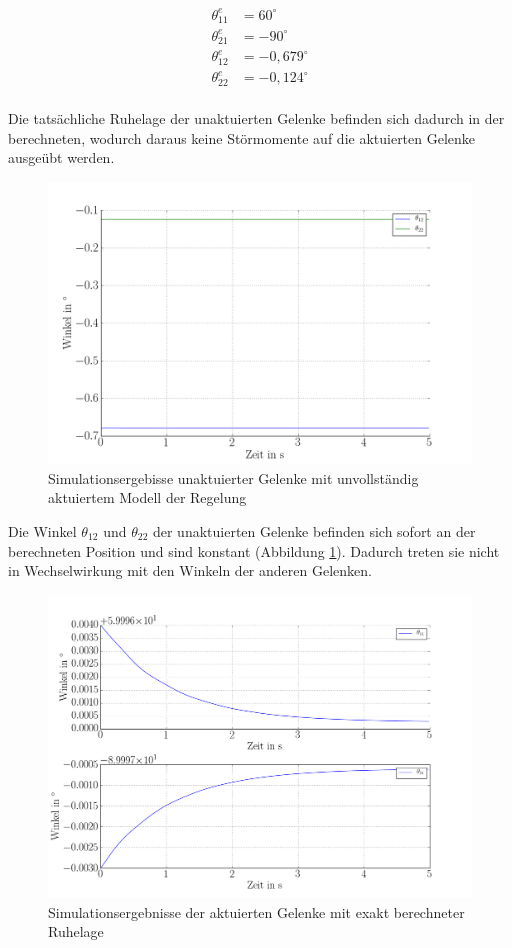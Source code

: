 \begin{align*}
\theta_{11}^e&=60^\circ\\
\theta_{21}^e&=-90^\circ\\
\theta_{12}^e&=-0,679^\circ\\
\theta_{22}^e&=-0,124^\circ\\
\end{align*}

Die tatsächliche Ruhelage der unaktuierten Gelenke befinden sich dadurch in der berechneten, wodurch daraus keine Störmomente auf die aktuierten Gelenke ausgeübt werden.

\begin{figure}[h]
\centering
\includegraphics[width=1\linewidth]{lsgunvollvoll_unakt.png}
\caption{Simulationsergebisse unaktuierter Gelenke mit unvollständig aktuiertem Modell der Regelung}
\label{fig:unvollMod}
\end{figure}

Die Winkel $\theta_{12}$ und $\theta_{22}$ der unaktuierten Gelenke befinden sich sofort an der berechneten Position und sind konstant (Abbildung \ref{fig:unvollMod}). Dadurch treten sie nicht in Wechselwirkung mit den Winkeln der anderen Gelenken.

\begin{figure}[h]
\centering
\includegraphics[width=1\linewidth]{lsgunvollvoll_akt.png}
\caption{Simulationsergebnisse der aktuierten Gelenke mit exakt berechneter Ruhelage}
\label{fig:lsgunvollvoll_unakt}
\end{figure}

